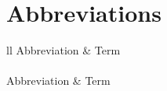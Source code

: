 \documentclass[
  12pt,
  openany]{book}
\author{}
\date{\vspace{-2.5em}}
\begin{document}
{
\setcounter{tocdepth}{4}
\tableofcontents
}
\cleardoublepage
{}
\pagestyle{fancy}
\fancyhf{}
\renewcommand{\headrulewidth}{0pt}
\fancyfoot[LE,RO]{\thepage}
\renewcommand{\floatpagefraction}{.9}

\setcounter{page}{11}

\hypertarget{abbreviations}{%
\chapter*{Abbreviations}\label{abbreviations}}

\begin{longtable}{ll}
\toprule
Abbreviation & Term\\
\midrule
\endfirsthead
{}\\
\toprule
Abbreviation & Term\\
\midrule
\endhead


\end{longtable}
\end{document}

